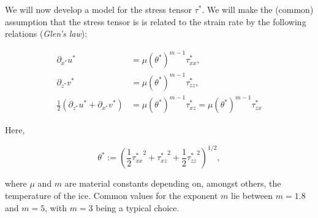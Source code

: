 We will now develop a model for the stress tensor $\tau^*$. We will make the (common) assumption that the stress tensor is is related to the strain rate by the following relations (\textit{Glen's law}):

\begin{equation}
  \begin{align}
    \partial_{x^*} u^* &= \mu(\theta^*)^{m-1} \tau_{xx}^*, \\
    \partial_{z^*} v^* &= \mu(\theta^*)^{m-1} \tau_{zz}^*, \\
    \frac{1}{2}(\partial_{z^*} u^* + \partial_{x^*} v^*) &= \mu(\theta^*)^{m-1} \tau_{xz}^* = \mu(\theta^*)^{m-1} \tau_{zx}^*
  \end{align}
\end{equation}

Here,

\begin{equation}
  \theta^* := \left( \frac{1}{2} {\tau_{xx}^*}^2 + {\tau_{xz}^*}^2 + \frac{1}{2} {\tau_{zz}^*}^2 \right) ^{1/2},
\end{equation}

where $\mu$ and $m$ are material constants depending on, amongst others, the temperature of the ice. Common values for the exponent $m$ lie between $m = 1.8$ and $m = 5$, with $m = 3$ being a typical choice.
